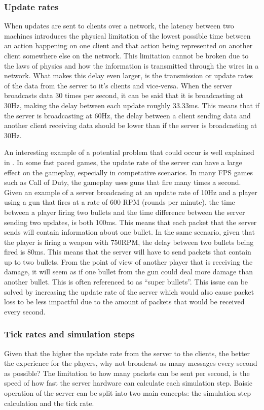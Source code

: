 \subsubsection{Update rates}
When updates are sent to clients over a network, the latency between two machines introduces the physical limitation of the lowest possible time between an action happening on one client and that action being represented on another client somewhere else on the network. This limitation cannot be broken due to the laws of physics and how the information is transmitted through the wires in a network. What makes this delay even larger, is the transmission or update rates of the data from the server to it's clients and vice-versa. When the server broadcasts data 30 times per second, it can be said that it is broadcasting at 30Hz, making the delay between each update roughly 33.33ms. This means that if the server is broadcasting at 60Hz, the delay between a client sending data and another client receiving data should be lower than if the server is broadcasting at 30Hz.

An interesting example of a potential problem that could occur is well explained in . In some fast paced games, the update rate of the server can have a large effect on the gameplay, especially in competative scenarios. In many FPS games such as Call of Duty, the gameplay uses guns that fire many times a second. Given an example of a server broadcasing at an update rate of 10Hz and a player using a gun that fires at a rate of 600 RPM (rounds per minute), the time between a player firing two bullets and the time difference between the server sending two updates, is both 100ms. This means that each packet that the server sends will contain information about one bullet. In the same scenario, given that the player is firing a weapon with 750RPM, the delay between two bullets being fired is 80ms. This means that the server will have to send packets that contain up to two bullets. From the point of view of another player that is receiving the damage, it will seem as if one bullet from the gun could deal more damage than another bullet. This is often referenced to as ``super bullets''. This issue can be solved by increasing the update rate of the server which would also cause packet loss to be less impactful due to the amount of packets that would be received every second.


\subsubsection{Tick rates and simulation steps}
Given that the higher the update rate from the server to the clients, the better the experience for the players, why not broadcast as many messages every second as possible? The limitation to how many packets can be sent per second, is the speed of how fast the server hardware can calculate each simulation step. Baisic operation of the server can be split into two main concepts: the simulation step calculation and the tick rate.

